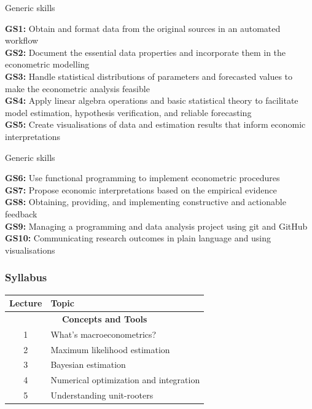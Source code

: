 \documentclass[notes,blackandwhite,mathsans]{beamer}
\begin{document}
\begin{frame}{Generic skills}

\textbf{GS1:} Obtain and format data from the original sources in an automated workflow\\[1ex]
\textbf{GS2:} Document the essential data properties and incorporate them in the econometric modelling\\[1ex]
\textbf{GS3:} Handle statistical distributions of parameters and forecasted values to make the econometric analysis feasible\\[1ex]
\textbf{GS4:} Apply linear algebra operations and basic statistical theory to facilitate model estimation, hypothesis verification, and reliable forecasting\\[1ex]
\textbf{GS5:} Create visualisations of data and estimation results that inform economic interpretations \\[1ex]

\end{frame}



\begin{frame}{Generic skills}

\textbf{GS6:} Use functional programming to implement econometric procedures\\[1ex]
\textbf{GS7:} Propose economic interpretations based on the empirical evidence\\[1ex]
\textbf{GS8:} Obtaining, providing, and implementing constructive and actionable feedback\\[1ex]
\textbf{GS9:} Managing a programming and data analysis project using git and GitHub\\[1ex]
\textbf{GS10:} Communicating research outcomes in plain language and using visualisations

\end{frame}







\begin{frame}
\frametitle{Syllabus}

\begin{center}
\begin{tabular}{ c l}
\toprule 
Lecture & Topic \\
\midrule
\multicolumn{2}{c}{\textbf{Concepts and Tools}}\\
1  & {\color{mcxs2}What's macroeconometrics?} \\
2  & {\color{mcxs2}Maximum likelihood estimation}  \\
3  & {\color{mcxs1}Bayesian estimation} \\
4  & {\color{mcxs2}Numerical optimization and integration} \\
5  & {\color{mcxs2}Understanding unit-rooters} \\[1ex]\bottomrule
\end{tabular}
\end{center}
\end{frame}
\end{document}
